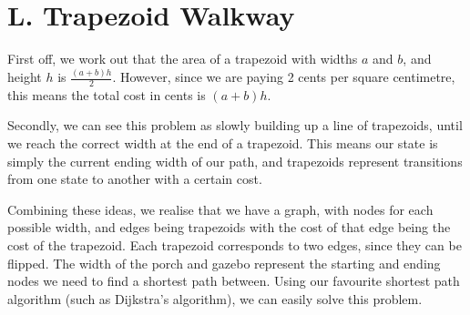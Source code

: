 \section*{L. Trapezoid Walkway}

First off, we work out that the area of a trapezoid with widths $a$ and $b$, and height $h$ is $\frac{(a + b)h}{2}$. However, since we are paying 2 cents per square centimetre, this means the total cost in cents is $(a + b)h$.

Secondly, we can see this problem as slowly building up a line of trapezoids, until we reach the correct width at the end of a trapezoid. This means our state is simply the current ending width of our path, and trapezoids represent transitions from one state to another with a certain cost.

Combining these ideas, we realise that we have a graph, with nodes for each possible width, and edges being trapezoids with the cost of that edge being the cost of the trapezoid. Each trapezoid corresponds to two edges, since they can be flipped. The width of the porch and gazebo represent the starting and ending nodes we need to find a shortest path between. Using our favourite shortest path algorithm (such as Dijkstra's algorithm), we can easily solve this problem.
